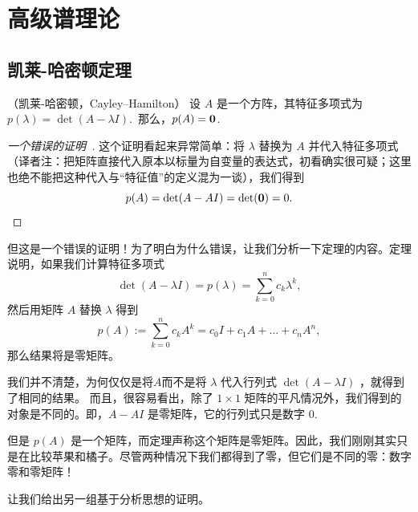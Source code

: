 


\chapter{高级谱理论}\label{chap:09}

\section{凯莱-哈密顿定理}\label{sec:09-01}

\begin{theorem}\label{stmt:09-01-01}（凯莱-哈密顿，Cayley–Hamilton）
设 $A$ 是一个方阵，其特征多项式为 $p(\lambda) = \det(A - \lambda I)$.~那么，$p(A) = \mathbf{0}$.~\end{theorem}

\begin{proof}[\normalfont\heiti 一个错误的证明~\nopunct]
这个证明看起来异常简单：将 $\lambda$ 替换为 $A$ 并代入特征多项式（译者注：把矩阵直接代入原本以标量为自变量的表达式，初看确实很可疑；这里也绝不能把这种代入与“特征值”的定义混为一谈），我们得到
$$p(A) = \det(A - AI) = \det(\mathbf{0}) = 0.$$\end{proof}

但这是一个错误的证明！为了明白为什么错误，让我们分析一下定理的内容。定理说明，如果我们计算特征多项式
$$\det(A - \lambda I) = p(\lambda) = \sum_{k=0}^n c_k \lambda^k,$$
然后用矩阵 $A$ 替换 $\lambda$ 得到
$$p(A) := \sum_{k=0}^n c_k A^k = c_0 I + c_1 A + \dots + c_n A^n,$$
那么结果将是零矩阵。

我们并不清楚，为何仅仅是将$A$而不是将 $\lambda$ 代入行列式 $\det(A - \lambda I)$ ，就得到了相同的结果。
而且，很容易看出，除了 $1 \times 1$ 矩阵的平凡情况外，我们得到的对象是不同的。即，$A - AI$ 是零矩阵，它的行列式只是数字 $0$.~

但是 $p(A)$ 是一个矩阵，而定理声称这个矩阵是零矩阵。因此，我们刚刚其实只是在比较苹果和橘子。尽管两种情况下我们都得到了零，但它们是不同的零：数字零和零矩阵！

让我们给出另一组基于分析思想的证明。


